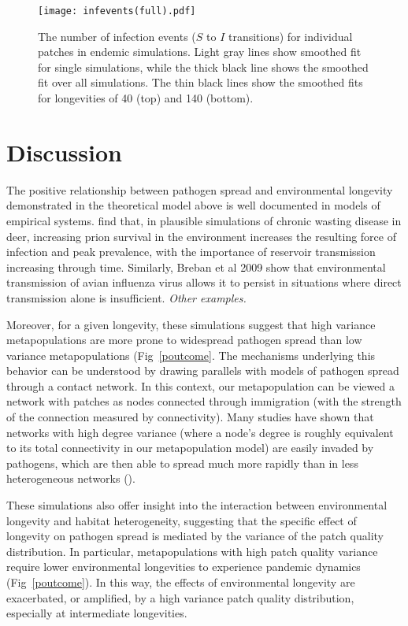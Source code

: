 \documentclass{svjour3}
\begin{document}
\begin{figure}
\centering
\texttt{[image: infevents(full).pdf]}
\caption{The number of infection events ($S$ to $I$ transitions) for individual patches in endemic simulations.  Light gray lines show smoothed fit for single simulations, while the thick black line shows the smoothed fit over all simulations.  The thin black lines show the smoothed fits for longevities of 40 (top) and 140 (bottom).}
\label{infections}
\end{figure}

\section{Discussion}
\label{discussion} 

The positive relationship between pathogen spread and environmental longevity demonstrated in the theoretical model above is well documented in models of empirical systems.  \cite{Almberg2011} find that, in plausible simulations of chronic wasting disease in deer, increasing prion survival in the environment increases the resulting force of infection and peak prevalence, with the  importance of reservoir transmission increasing through time.  Similarly, Breban et al 2009 show that environmental transmission of avian influenza virus allows it to persist in situations where direct transmission alone is insufficient.  \emph{Other examples.}

Moreover, for a given longevity, these simulations suggest that high variance metapopulations are more prone to widespread pathogen spread than low variance metapopulations (Fig~\ref{poutcome}.  The mechanisms underlying this behavior can be understood by drawing parallels with models of pathogen spread through a contact network.  In this context, our metapopulation can be viewed a network with patches as nodes connected through immigration (with the strength of the connection measured by connectivity).  Many studies have shown that networks with high degree variance (where a node's degree is roughly equivalent to its total connectivity in our metapopulation model) are easily invaded by pathogens, which are then able to spread much more rapidly than in less heterogeneous networks (\cite{Pastor-Satorras2001}).

These simulations also offer insight into the interaction between environmental longevity and habitat heterogeneity, suggesting that the specific effect of longevity on pathogen spread is mediated by the variance of the patch quality distribution.  In particular, metapopulations with high patch quality variance require lower environmental longevities to experience pandemic dynamics (Fig~\ref{poutcome}).  In this way, the effects of environmental longevity are exacerbated, or amplified, by a high variance patch quality distribution, especially at intermediate longevities.  
\end{document}
